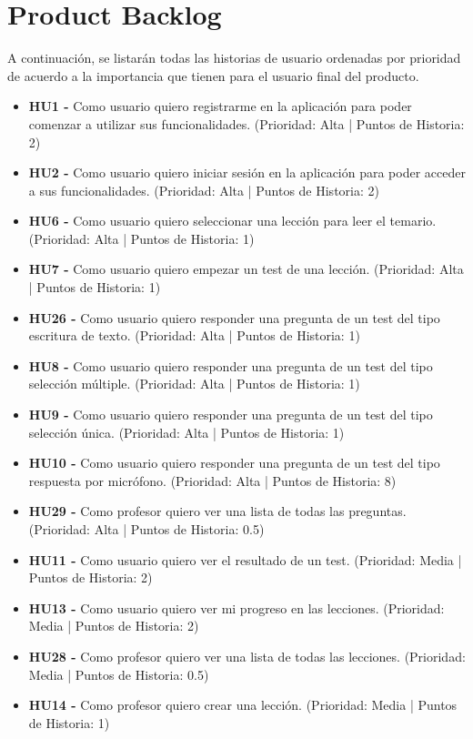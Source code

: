 \section{Product Backlog}
A continuación, se listarán todas las historias de usuario ordenadas por prioridad de acuerdo a la importancia que tienen para el usuario final del producto.
\begin{itemize}
    \item \textbf{HU1 - } Como usuario quiero registrarme en la aplicación para poder comenzar a utilizar sus funcionalidades. (Prioridad: Alta | Puntos de Historia: 2)
    \item \textbf{HU2 - } Como usuario quiero iniciar sesión en la aplicación para poder acceder a sus funcionalidades. (Prioridad: Alta | Puntos de Historia: 2)
    \item \textbf{HU6 - } Como usuario quiero seleccionar una lección para leer el temario. (Prioridad: Alta | Puntos de Historia: 1)
    \item \textbf{HU7 - } Como usuario quiero empezar un test de una lección. (Prioridad: Alta | Puntos de Historia: 1)
    \item \textbf{HU26 - } Como usuario quiero responder una pregunta de un test del tipo escritura de texto. (Prioridad: Alta | Puntos de Historia: 1)
    \item \textbf{HU8 - } Como usuario quiero responder una pregunta de un test del tipo selección múltiple. (Prioridad: Alta | Puntos de Historia: 1)
    \item \textbf{HU9 - } Como usuario quiero responder una pregunta de un test del tipo selección única. (Prioridad: Alta | Puntos de Historia: 1)
    \item \textbf{HU10 - } Como usuario quiero responder una pregunta de un test del tipo respuesta por micrófono. (Prioridad: Alta | Puntos de Historia: 8)
    \item \textbf{HU29 - } Como profesor quiero ver una lista de todas las preguntas. (Prioridad: Alta | Puntos de Historia: 0.5)
    \item \textbf{HU11 - } Como usuario quiero ver el resultado de un test. (Prioridad: Media | Puntos de Historia: 2)
    \item \textbf{HU13 - } Como usuario quiero ver mi progreso en las lecciones. (Prioridad: Media | Puntos de Historia: 2)
    \item \textbf{HU28 - } Como profesor quiero ver una lista de todas las lecciones. (Prioridad: Media | Puntos de Historia: 0.5)
    \item \textbf{HU14 - } Como profesor quiero crear una lección. (Prioridad: Media | Puntos de Historia: 1)

\end{itemize}
